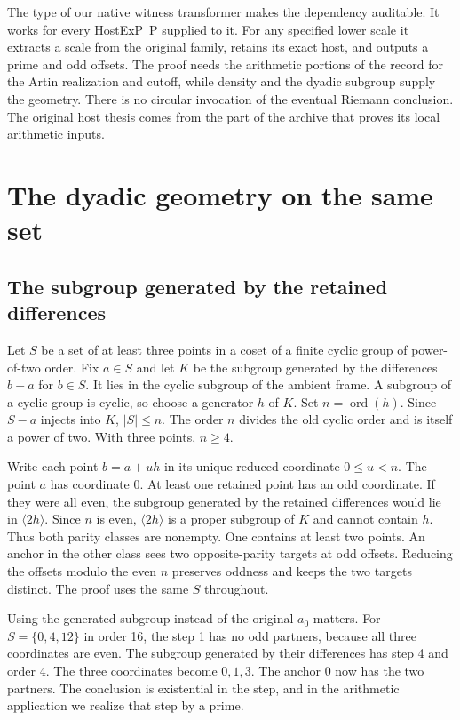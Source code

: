 \documentclass[12pt,letterpaper]{article}
\DeclareRobustCommand{\id}[1]{\mbox{\small\ttfamily #1}}
\begin{document}
The type of our native witness transformer makes the dependency auditable. It works for every \id{HostExP P} supplied to it. For any specified lower scale it extracts a scale from the original family, retains its exact host, and outputs a prime and odd offsets. The proof needs the arithmetic portions of the record for the Artin realization and cutoff, while density and the dyadic subgroup supply the geometry. There is no circular invocation of the eventual Riemann conclusion. The original host thesis comes from the part of the archive that proves its local arithmetic inputs.

\section{The dyadic geometry on the same set}
\label{sec:geometry}

\subsection{The subgroup generated by the retained differences}

Let \(S\) be a set of at least three points in a coset of a finite cyclic group of power-of-two order. Fix \(a\in S\) and let \(K\) be the subgroup generated by the differences \(b-a\) for \(b\in S\). It lies in the cyclic subgroup of the ambient frame. A subgroup of a cyclic group is cyclic, so choose a generator \(h\) of \(K\). Set \(n=\operatorname{ord}(h)\). Since \(S-a\) injects into \(K\), \(|S|\le n\). The order \(n\) divides the old cyclic order and is itself a power of two. With three points, \(n\ge4\).

Write each point \(b=a+u h\) in its unique reduced coordinate \(0\le u<n\). The point \(a\) has coordinate 0. At least one retained point has an odd coordinate. If they were all even, the subgroup generated by the retained differences would lie in \(\langle 2h\rangle\). Since \(n\) is even, \(\langle 2h\rangle\) is a proper subgroup of \(K\) and cannot contain \(h\). Thus both parity classes are nonempty. One contains at least two points. An anchor in the other class sees two opposite-parity targets at odd offsets. Reducing the offsets modulo the even \(n\) preserves oddness and keeps the two targets distinct. The proof uses the same \(S\) throughout.

Using the generated subgroup instead of the original \(a_0\) matters. For \(S=\{0,4,12\}\) in order 16, the step 1 has no odd partners, because all three coordinates are even. The subgroup generated by their differences has step 4 and order 4. The three coordinates become \(0,1,3\). The anchor 0 now has the two partners. The conclusion is existential in the step, and in the arithmetic application we realize that step by a prime.
\end{document}
